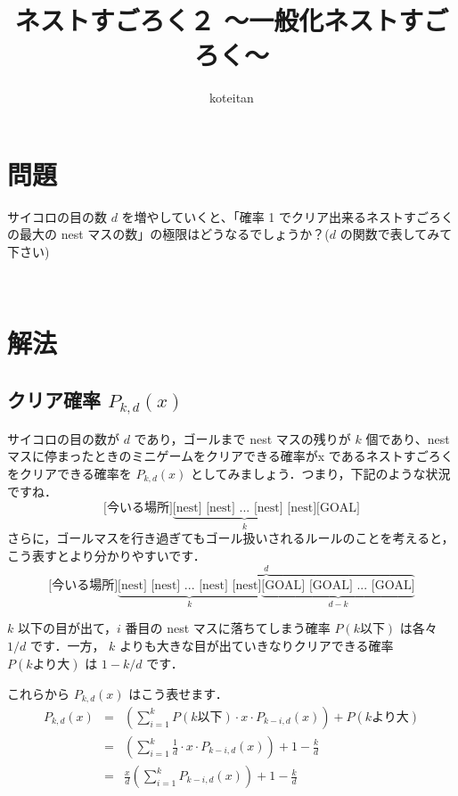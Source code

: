 \documentclass[a4j, 12pt]{jsarticle}
\author{koteitan}
\title{ネストすごろく２ ～一般化ネストすごろく～}
\renewcommand{\P}{P_{k,d}(x)}
\begin{document}
\maketitle

\section{問題}
\begin{shadebox}
  [問2] サイコロの目の数 $d$ を増やしていくと、「確率 1 でクリア出来るネストすごろく\cite{nestsugoroku}の最大の nest マスの数」の極限はどうなるでしょうか？($d$ の関数で表してみて下さい)\cite{nestsugoroku2}
\end{shadebox} 
~

\section{解法}
\subsection{クリア確率 $\P$}
サイコロの目の数が $d$ であり，ゴールまで nest マスの残りが $k$ 個であり、nest マスに停まったときのミニゲームをクリアできる確率がx であるネストすごろくをクリアできる確率を $\P$ としてみましょう．つまり，下記のような状況ですね．
\begin{equation*}
  \textrm{[今いる場所]} \underbrace{\textrm{[nest] [nest] ... [nest] [nest]}}_{k} \textrm{[GOAL]}
\end{equation*}
さらに，ゴールマスを行き過ぎてもゴール扱いされるルールのことを考えると，こう表すとより分かりやすいです．
\begin{equation*}
  \textrm{[今いる場所]} \overbrace{\underbrace{\textrm{[nest] [nest] ... [nest] [nest]}}_{k} \underbrace{\textrm{[GOAL] [GOAL] ... [GOAL]}}_{d-k}}^{d}
\end{equation*}

$k$ 以下の目が出て，$i$ 番目の nest マスに落ちてしまう確率 $P(k\textrm{以下})$ は各々 $1/d$ です．一方，
$k$ よりも大きな目が出ていきなりクリアできる確率 $P(k\textrm{より大})$ は $1-k/d$ です．

これらから $\P$ はこう表せます．
\begin{eqnarray}
  \P&=&\left(\sum_{i=1}^kP(k\textrm{以下})\cdot x \cdot P_{k-i,d}(x)\right) + P(k\textrm{より大})\\
    &=&\left(\sum_{i=1}^k\frac{1}{d}\cdot x \cdot P_{k-i,d}(x)\right) + 1-\frac{k}{d}\\
    &=&\frac{x}{d} \left(\sum_{i=1}^kP_{k-i,d}(x)\right) + 1-\frac{k}{d}
\end{eqnarray}
\end{document}
